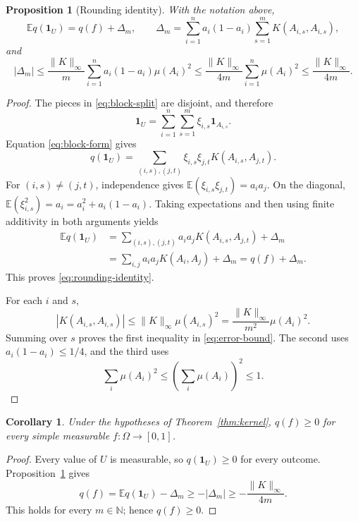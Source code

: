 \documentclass[reqno]{amsart}
\theoremstyle{plain}
\newtheorem{proposition}[theorem]{Proposition}
\newtheorem{corollary}[theorem]{Corollary}
\theoremstyle{remark}
\newcommand{\one}{\mathbf 1}
\newcommand{\E}{\mathbb E}
\newcommand{\N}{\mathbb N}
\newcommand{\norminf}[1]{\lVert #1\rVert_\infty}
\begin{document}
\begin{proposition}[Rounding identity]\label{prop:rounding}
With the notation above,
\begin{equation}\label{eq:rounding-identity}
  \E q(\one_U)=q(f)+\Delta_m,
  \qquad
  \Delta_m=\sum_{i=1}^n a_i(1-a_i)
      \sum_{s=1}^mK(A_{i,s},A_{i,s}),
\end{equation}
and
\begin{equation}\label{eq:error-bound}
  |\Delta_m|
  \leq \frac{\norminf{K}}m
         \sum_{i=1}^n a_i(1-a_i)\mu(A_i)^2
  \leq \frac{\norminf{K}}{4m}
         \sum_{i=1}^n\mu(A_i)^2
  \leq \frac{\norminf{K}}{4m}.
\end{equation}
\end{proposition}

\begin{proof}
The pieces in \eqref{eq:block-split} are disjoint, and therefore
\[
  \one_U=\sum_{i=1}^n\sum_{s=1}^m\xi_{i,s}\one_{A_{i,s}}.
\]
Equation \eqref{eq:block-form} gives
\[
  q(\one_U)=
  \sum_{(i,s),(j,t)}
  \xi_{i,s}\xi_{j,t}K(A_{i,s},A_{j,t}).
\]
For $(i,s)\neq(j,t)$, independence gives
$\E(\xi_{i,s}\xi_{j,t})=a_i a_j$. On the diagonal,
$\E(\xi_{i,s}^2)=a_i=a_i^2+a_i(1-a_i)$. Taking expectations and then using
finite additivity in both arguments yields
\[
\begin{split}
  \E q(\one_U)
  &=\sum_{(i,s),(j,t)}a_i a_jK(A_{i,s},A_{j,t})+\Delta_m\\
  &=\sum_{i,j}a_i a_jK(A_i,A_j)+\Delta_m
   =q(f)+\Delta_m.
\end{split}
\]
This proves \eqref{eq:rounding-identity}.

For each $i$ and $s$,
\[
  |K(A_{i,s},A_{i,s})|
  \leq\norminf{K}\mu(A_{i,s})^2
  =\frac{\norminf{K}}{m^2}\mu(A_i)^2.
\]
Summing over $s$ proves the first inequality in \eqref{eq:error-bound}. The
second uses $a_i(1-a_i)\leq1/4$, and the third uses
\[
  \sum_i\mu(A_i)^2
  \leq\left(\sum_i\mu(A_i)\right)^2
  \leq1.
\]
\end{proof}

\begin{corollary}\label{cor:simple}
Under the hypotheses of Theorem~\ref{thm:kernel}, $q(f)\geq0$ for every simple
measurable $f\colon\Omega\to[0,1]$.
\end{corollary}

\begin{proof}
Every value of $U$ is measurable, so $q(\one_U)\geq0$ for every outcome.
Proposition~\ref{prop:rounding} gives
\[
  q(f)=\E q(\one_U)-\Delta_m
  \geq-|\Delta_m|
  \geq-\frac{\norminf{K}}{4m}.
\]
This holds for every $m\in\N$; hence $q(f)\geq0$.
\end{proof}
\end{document}
